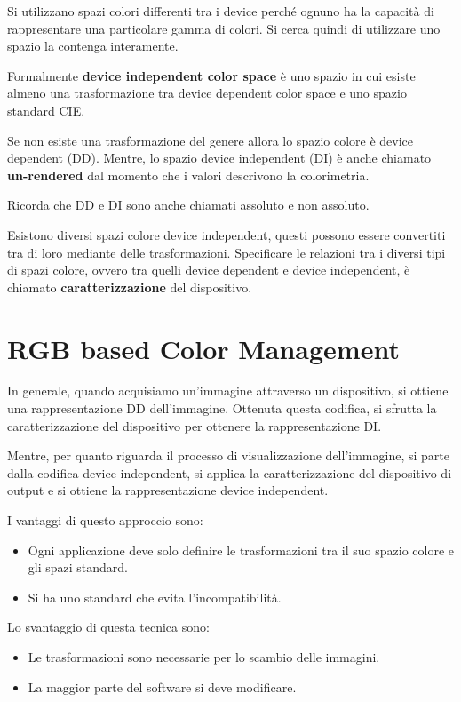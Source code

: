 Si utilizzano spazi colori differenti tra i device perché ognuno ha la capacità
di rappresentare una particolare gamma di colori. Si cerca quindi di utilizzare
uno spazio la contenga interamente.

\begin{definizione}
    Formalmente \textbf{device independent color space} è uno spazio in cui
    esiste almeno una trasformazione tra device dependent color space e uno
    spazio standard CIE.
\end{definizione}

Se non esiste una trasformazione del genere allora lo spazio colore è device
dependent (DD). Mentre, lo spazio device independent (DI) è anche chiamato
\textbf{un-rendered} dal momento che i valori descrivono la colorimetria.

\begin{nota}
    Ricorda che DD e DI sono anche chiamati assoluto e non assoluto.
\end{nota}

Esistono diversi spazi colore device independent, questi possono essere
convertiti tra di loro mediante delle trasformazioni. Specificare le relazioni
tra i diversi tipi di spazi colore, ovvero tra quelli device dependent e
device independent, è chiamato \textbf{caratterizzazione} del dispositivo.

\section{RGB based Color Management}
In generale, quando acquisiamo un'immagine attraverso un dispositivo, si ottiene
una rappresentazione DD dell'immagine. Ottenuta questa codifica, si sfrutta la
caratterizzazione del dispositivo per ottenere la rappresentazione DI.

Mentre, per quanto riguarda il processo di visualizzazione dell'immagine, si
parte dalla codifica device independent, si applica la caratterizzazione del
dispositivo di output e si ottiene la rappresentazione device independent.

I vantaggi di questo approccio sono:
\begin{itemize}
    \item Ogni applicazione deve solo definire le trasformazioni tra il suo spazio
          colore e gli spazi standard.
    \item Si ha uno standard che evita l'incompatibilità.
\end{itemize}
Lo svantaggio di questa tecnica sono:
\begin{itemize}
    \item Le trasformazioni sono necessarie per lo scambio delle immagini.
    \item La maggior parte del software si deve modificare.
\end{itemize}

